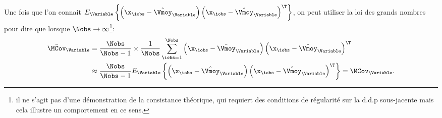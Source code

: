 \begin{remark}
%
%
%
%
%
\end{remark}


\begin{remark}
Une fois que l'on connait $E_\Variable\left\{\left(\x_\iobs-\hat{\Vmoy}_\Variable\right)\left(\x_\iobs-\hat{\Vmoy}_\Variable\right)^\T\right\}$, on peut utiliser la loi des grands nombres pour dire que lorsque $\Nobs\to\infty$\footnote{il ne s'agit pas d'une démonstration de la consistance théorique, qui requiert des conditions de régularité sur la d.d.p sous-jacente mais cela illustre un comportement en ce sens.}:
  \begin{align*}
    \hat{\MCov}_\Variable &= \frac{\Nobs}{\Nobs-1}\times\frac{1}{\Nobs} \sum_{\iobs=1}^\Nobs\left(\x_\iobs-\hat{\Vmoy}_\Variable\right)\left(\x_\iobs-\hat{\Vmoy}_\Variable\right)^\T \\
    & \approx  \frac{\Nobs}{\Nobs-1} E_\Variable\left\{\left(\x_\iobs-\hat{\Vmoy}_\Variable\right)\left(\x_\iobs-\hat{\Vmoy}_\Variable\right)^\T\right\}  = \MCov_\Variable.
\end{align*}
\end{remark}


